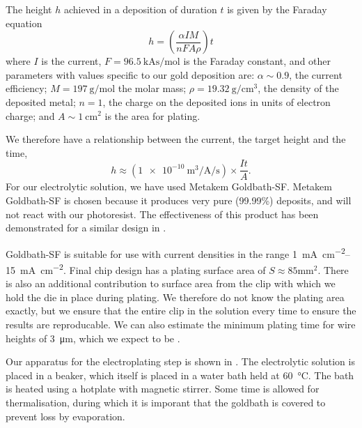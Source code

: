 The height $h$ achieved in a deposition of duration $t$ is given by the Faraday
equation~\cite{Ruythooren_2000}
%
\begin{equation}
  h = \left(\frac{\alpha I M}{nFA\rho}\right)t
  \label{fab:eqn:faraday}
\end{equation}
%
where $I$ is the current, $F=\SI{96.5}{\kilo\ampere\second\per\mole}$ is the
Faraday constant, and other parameters with values specific to our gold
deposition are: $\alpha\sim0.9$, the current efficiency; $M =
\SI{197}{\gram\per\mole}$ the molar mass;
$\rho=\SI{19.32}{\gram\per\centi\meter\cubed}$, the density of the deposited
metal; $n=1$, the charge on the deposited ions in units of electron charge; and
$A\sim\SI{1}{\centi\meter\squared}$ is the area for plating.

We therefore have a relationship between the current, the target height and the
time,
%
\begin{equation}
  h \approx \left(
  \SI[per-mode=fraction]{1e-10}{\meter\cubed\per\ampere\per\second} \right)
  \times\frac{It}{A}.
\end{equation}
%
For our electrolytic solution, we have used Metakem Goldbath-SF.
Metakem Goldbath-SF is chosen because it produces very pure (99.99\%) deposits,
and will not react with our photoresist. The effectiveness of this product has
been demonstrated for a similar design in .
%

Goldbath-SF is suitable for use with current densities in the range
\SIrange{1}{15}{\milli\ampere\per\centi\meter\squared}. Final chip design has a
plating surface area of $S\approx85\si{\milli\meter\squared}$. There is also an
additional contribution to surface area from the clip with which we hold the
die in place during plating. We therefore do not know the plating area
exactly, but we ensure that the entire clip in the solution every time to
ensure the results are reproducable. We can also estimate the minimum plating
time for wire heights of \SI{3}{\micro\meter}, which we expect to be
.


Our apparatus for the electroplating step is shown in
. The electrolytic solution is placed in a
beaker, which itself is placed in a water bath held at \SI{60}{\celsius}. The
bath is heated using a hotplate with magnetic stirrer. Some time is allowed for
thermalisation, during which it is imporant that the goldbath is covered to
prevent loss by evaporation.

